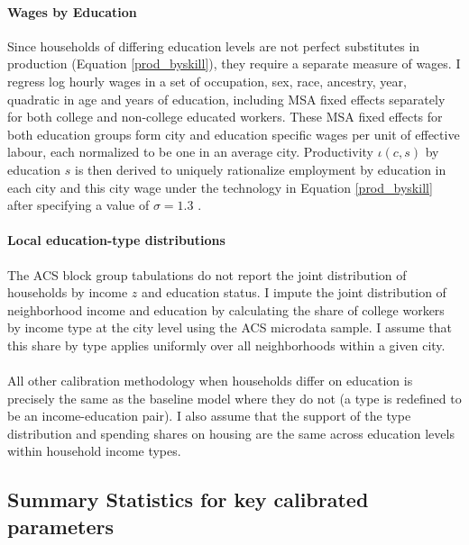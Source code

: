 \documentclass[12pt]{article}
\begin{document}
	\paragraph*{Wages by Education} Since households of differing education levels are not perfect substitutes in production (Equation \ref{prod_byskill}), they require a separate measure of wages. I regress log hourly wages in a set of occupation, sex, race, ancestry, year, quadratic in age and years of education, including MSA fixed effects separately for both college and non-college educated workers. These MSA fixed effects for both education groups form city and education specific wages per unit of effective labour, each normalized to be one in an average city. Productivity $\iota(c, s)$ by education $s$ is then derived to uniquely rationalize employment by education in each city and this city wage under the technology in Equation \eqref{prod_byskill} after specifying a value of $\sigma = 1.3$ \citep{card}.
	
	\paragraph*{Local education-type distributions} The ACS block group tabulations do not report the joint distribution of households by income $z$ and education status. I impute the joint distribution of neighborhood income and education by calculating the share of college workers by income type at the city level using the ACS microdata sample. I assume that this share by type applies uniformly over all neighborhoods within a given city. 
	
	\paragraph*{}
	All other calibration methodology when households differ on education is precisely the same as the baseline model where they do not (a type is redefined to be an income-education pair). I also assume that the support of the type distribution and spending shares on housing are the same across education levels within household income types. 
	
	
	\subsection{Summary Statistics for key calibrated parameters}\label{Appendix:CalibPara}
	
\end{document}
